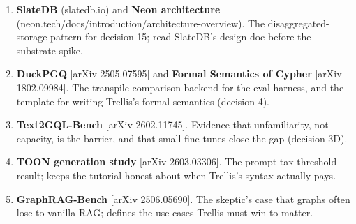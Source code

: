 \documentclass[11pt]{article}
\begin{document}
\begin{enumerate}[leftmargin=1.6em,itemsep=3pt]
  \item \textbf{SlateDB} (slatedb.io) and \textbf{Neon architecture} (neon.tech/docs/introduction/architecture-overview). The disaggregated-storage pattern for decision 15; read SlateDB's design doc before the substrate spike.
  \item \textbf{DuckPGQ} [arXiv 2505.07595] and \textbf{Formal Semantics of Cypher} [arXiv 1802.09984]. The transpile-comparison backend for the eval harness, and the template for writing Trellis's formal semantics (decision 4).
  \item \textbf{Text2GQL-Bench} [arXiv 2602.11745]. Evidence that unfamiliarity, not capacity, is the barrier, and that small fine-tunes close the gap (decision 3D).
  \item \textbf{TOON generation study} [arXiv 2603.03306]. The prompt-tax threshold result; keeps the tutorial honest about when Trellis's syntax actually pays.
  \item \textbf{GraphRAG-Bench} [arXiv 2506.05690]. The skeptic's case that graphs often lose to vanilla RAG; defines the use cases Trellis must win to matter.
\end{enumerate}
\end{document}
